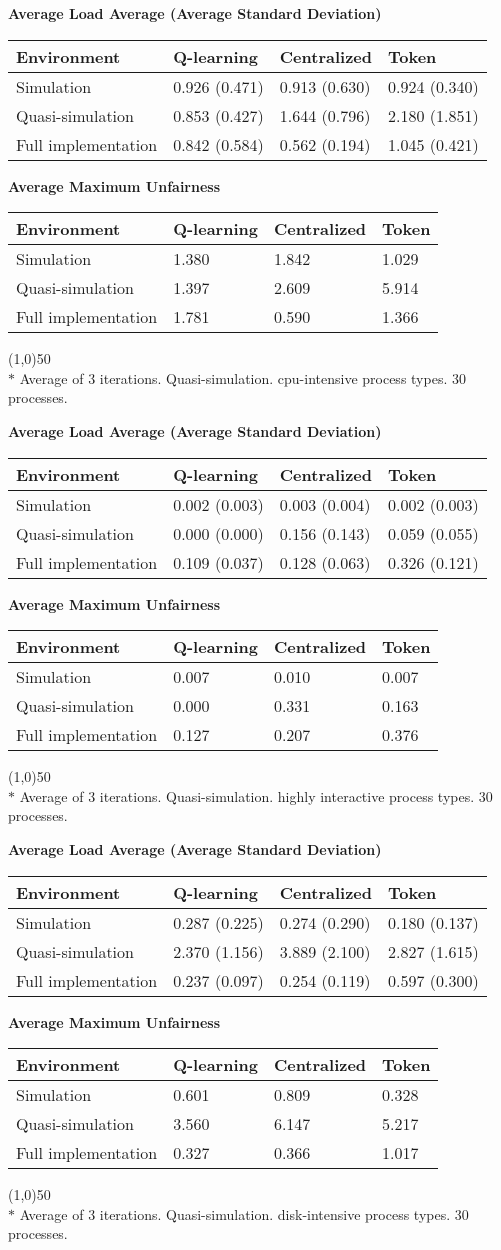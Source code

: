 \documentclass{article}
\newcommand{\envtbl}[5]{
\begin{center}
\textbf{#1}
\end{center}

\begin{tabularx}{\linewidth}{|X|X|X|X|} \hline
	\textbf{Environment} & \textbf{Q-learning} & \textbf{Centralized} & \textbf{Token} \\ \hline
	#2
\end{tabularx}

\begin{center}
\textbf{#3}
\end{center}

\begin{tabularx}{\linewidth}{|X|X|X|X|} \hline
	\textbf{Environment} & \textbf{Q-learning} & \textbf{Centralized} & \textbf{Token} \\ \hline
	#4
\end{tabularx}

\vspace{1em}
\line(1,0){50} \\
#5
}
\begin{document}
\envtbl{Average Load Average (Average Standard Deviation)}
{	Simulation  & 0.926 (0.471) & 0.913 (0.630) & 0.924 (0.340)  \\ \hline
	Quasi-simulation  & 0.853 (0.427) & 1.644 (0.796) & 2.180 (1.851) \\ \hline
	Full implementation & 0.842 (0.584) & 0.562 (0.194) & 1.045 (0.421) \\ \hline}
{Average Maximum Unfairness}
{	Simulation  & 1.380 & 1.842 & 1.029  \\ \hline
	Quasi-simulation  & 1.397 & 2.609 & 5.914 \\ \hline
	Full implementation & 1.781 & 0.590 & 1.366 \\ \hline}
{$*$ Average of 3 iterations.  Quasi-simulation.  cpu-intensive process types.  30
processes.}


\clearpage

\envtbl{Average Load Average (Average Standard Deviation)}
{	Simulation  & 0.002 (0.003) & 0.003 (0.004) & 0.002 (0.003)  \\ \hline
	Quasi-simulation  & 0.000 (0.000) & 0.156 (0.143) & 0.059 (0.055) \\ \hline
	Full implementation & 0.109 (0.037) & 0.128 (0.063) & 0.326 (0.121) \\ \hline}
{Average Maximum Unfairness}
{	Simulation  & 0.007 & 0.010 & 0.007  \\ \hline
	Quasi-simulation  & 0.000 & 0.331 & 0.163 \\ \hline
	Full implementation & 0.127 & 0.207 & 0.376 \\ \hline}
{$*$ Average of 3 iterations.  Quasi-simulation.  highly interactive process
types.  30 processes.}


\clearpage

\envtbl{Average Load Average (Average Standard Deviation)}
{	Simulation  & 0.287 (0.225) & 0.274 (0.290) & 0.180 (0.137)  \\ \hline
	Quasi-simulation  & 2.370 (1.156) & 3.889 (2.100) & 2.827 (1.615) \\ \hline
	Full implementation & 0.237 (0.097) & 0.254 (0.119) & 0.597 (0.300) \\ \hline}
{Average Maximum Unfairness}
{	Simulation  & 0.601 & 0.809 & 0.328  \\ \hline
	Quasi-simulation  & 3.560 & 6.147 & 5.217 \\ \hline
	Full implementation & 0.327 & 0.366 & 1.017 \\ \hline}
{$*$ Average of 3 iterations.  Quasi-simulation.  disk-intensive process
types.  30 processes.}
\end{document}
